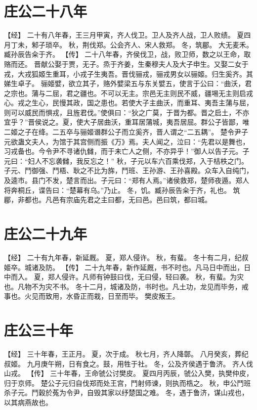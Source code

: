 \documentclass[a4paper,12pt,UTF8,twoside]{ctexbook}
\begin{document}
\section{庄公二十八年}

【经】
二十有八年春，王三月甲寅，齐人伐卫。卫人及齐人战，卫人败绩。
夏四月丁未，邾子琐卒。
秋，荆伐郑。公会齐人、宋人救郑。
冬，筑郿。
大无麦禾。臧孙辰告籴于齐。
【传】
二十八年春，齐侯伐卫，战，败卫师，数之以王命，取赂而还。
晋献公娶于贾，无子。烝于齐姜，生秦穆夫人及大子申生。又娶二女于戎，大戎狐姬生重耳，小戎子生夷吾。晋伐骊戎，骊戎男女以骊姬。归生奚齐。其娣生卓子。
骊姬嬖，欲立其子，赂外嬖梁五与东关嬖五，使言于公曰：“曲沃，君之宗也。蒲与二屈，君之疆也。不可以无主。宗邑无主则民不威，疆埸无主则启戎心。戎之生心，民慢其政，国之患也。若使大子主曲沃，而重耳、夷吾主蒲与屈，则可以威民而惧戎，且旌君伐。”使俱曰：“狄之广莫，于晋为都。晋之启土，不亦宜乎？”晋侯说之。夏，使大子居曲沃，重耳居蒲城，夷吾居屈。群公子皆鄙，唯二姬之子在绛。二五卒与骊姬谮群公子而立奚齐，晋人谓之“二五耦”。
楚令尹子元欲蛊文夫人，为馆于其宫侧而振《万》焉。夫人闻之，泣曰：“先君以是舞也，习戎备也。今令尹不寻诸仇雠，而于未亡人之侧，不亦异乎！”御人以告子元。子元曰：“妇人不忘袭雠，我反忘之！”
秋，子元以车六百乘伐郑，入于桔柣之门。子元、鬥御强、鬥梧、耿之不比为旆，鬥班、王孙游、王孙喜殿。众车入自纯门，及逵市。县门不发，楚言而出。子元曰：“郑有人焉。”诸侯救郑，楚师夜遁。郑人将奔桐丘，谍告曰：“楚幕有乌。”乃止。
冬，饥。臧孙辰告籴于齐，礼也。
筑郿，非都也。凡邑有宗庙先君之主曰都，无曰邑。邑曰筑，都曰城。

\section{庄公二十九年}

【经】
二十有九年春，新延厩。
夏，郑人侵许。
秋，有蜚。
冬十有二月，纪叔姬卒。城诸及防。
【传】
二十九年春，新作延厩，书不时也。凡马日中而出，日中而入。
夏，郑人侵许。凡师有钟鼓曰伐，无曰侵，轻曰袭。
秋，有蜚。为灾也。凡物不为灾不书。
冬十二月，城诸及防，书时也。凡土功，龙见而毕务，戒事也。火见而致用，水昏正而栽，日至而毕。
樊皮叛王。

\section{庄公三十年}

【经】
三十年春，王正月。
夏，次于成。
秋七月，齐人降鄣。
八月癸亥，葬纪叔姬。
九月庚午朔，日有食之。鼓，用牲于社。
冬，公及齐侯遇于鲁济。
齐人伐山戎。
【传】
三十年春，王命虢公讨樊皮。
夏四月丙辰，虢公入樊，执樊仲皮，归于京师。
楚公子元归自伐郑而处王宫，鬥射师谏，则执而梏之。
秋，申公鬥班杀子元。鬥穀於菟为令尹，自毁其家以纾楚国之难。
冬，遇于鲁济，谋山戎也，以其病燕故也。
\end{document}
